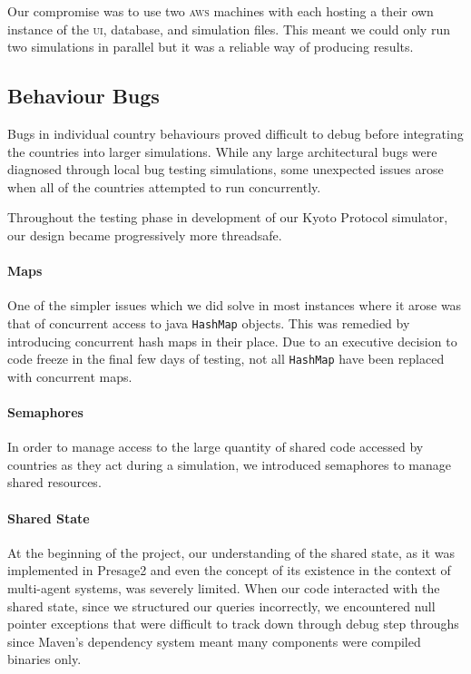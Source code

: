 Our compromise was to use two \textsc{aws} machines with each hosting a their own instance of the \textsc{ui}, database, and simulation files.  This meant we could only run two simulations in parallel but it was a reliable way of producing results.

\subsection{Behaviour Bugs}

Bugs in individual country behaviours proved difficult to debug before integrating the countries into larger simulations. While any large architectural bugs were diagnosed through local bug testing simulations, some unexpected issues arose when all of the countries attempted to run concurrently.

Throughout the testing phase in development of our Kyoto Protocol simulator, our design became progressively more threadsafe.

\paragraph{Maps} 
One of the simpler issues which we did solve in most instances where it arose was that of concurrent access to java \texttt{HashMap} objects. This was remedied by introducing concurrent hash maps in their place. Due to an executive decision to code freeze in the final few days of testing, not all \texttt{HashMap} have been replaced with concurrent maps.

\paragraph{Semaphores}
In order to manage access to the large quantity of shared code accessed by countries as they act during a simulation, we introduced semaphores to manage shared resources.

\paragraph{Shared State}
At the beginning of the project, our understanding of the shared state, as it was implemented in Presage2 and even the concept of its existence in the context of multi-agent systems, was severely limited. When our code interacted with the shared state, since we structured our queries incorrectly, we encountered null pointer exceptions that were difficult to track down through debug step throughs since Maven's dependency system meant many components were compiled binaries only.

